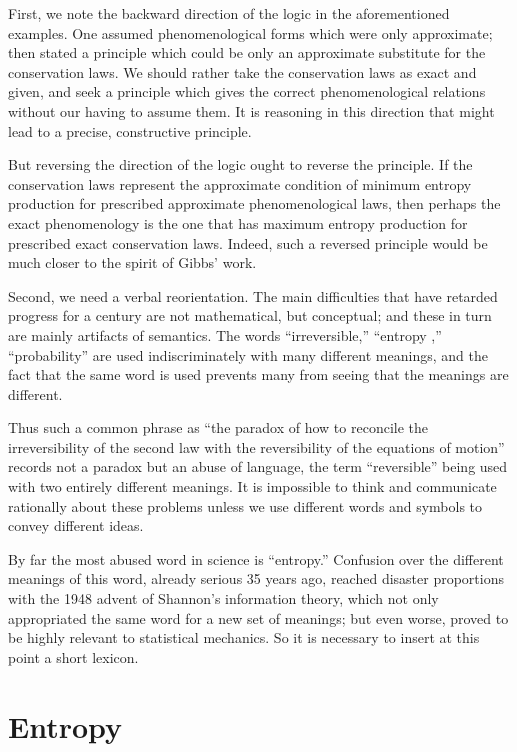 \documentclass{article}
\begin{document}
First, we note the backward direction of the logic in the aforementioned examples. One assumed phenomenological forms which were only approximate; then stated a principle which could be only an approximate substitute for the conservation laws. We should rather take the conservation laws as exact and given, and seek a principle which gives the correct phenomenological relations without our having to assume them. It is reasoning in this direction that might lead to a precise, constructive principle.

But reversing the direction of the logic ought to reverse the principle. If the conservation laws represent the approximate condition of minimum entropy production for prescribed approximate phenomenological laws, then perhaps the exact phenomenology is the one that has maximum entropy production for prescribed exact conservation laws. Indeed, such a reversed principle would be much closer to the spirit of Gibbs' work.

Second, we need a verbal reorientation. The main difficulties that have retarded progress for a century are not mathematical, but conceptual; and these in turn are mainly artifacts of semantics. The words ``irreversible,'' ``entropy ,'' ``probability'' are used indiscriminately with many different meanings, and the fact that the same word is used prevents many from seeing that the meanings are different.

Thus such a common phrase as ``the paradox of how to reconcile the irreversibility of the second law with the reversibility of the equations of motion'' records not a paradox but an abuse of language, the term ``reversible'' being used with two entirely different meanings. It is impossible to think and communicate rationally about these problems unless we use different words and symbols to convey different ideas.

By far the most abused word in science is ``entropy.'' Confusion over the different meanings of this word, already serious 35 years ago, reached disaster proportions with the 1948 advent of Shannon's information theory, which not only appropriated the same word for a new set of meanings; but even worse, proved to be highly relevant to statistical mechanics. So it is necessary to insert at this point a short lexicon.

\section{Entropy}
\end{document}
